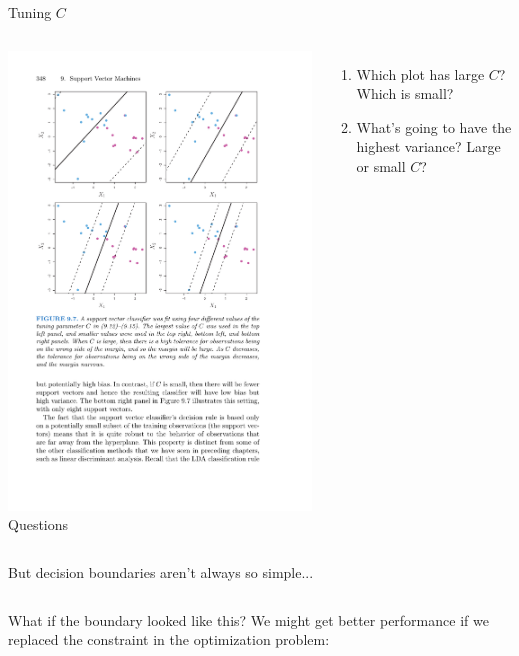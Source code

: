 \documentclass[mathserif, aspectratio=169]{beamer}
\begin{document}
\begin{frame}{Tuning $C$}
\begin{columns}
\includegraphics[height = 0.9\textheight]{small_vs_big_C}
Questions
\begin{enumerate}
\item Which plot has large $C$?  Which is small?
\item What's going to have the highest variance?  Large or small $C$?
\end{enumerate}

\end{columns}
\end{frame}

\begin{frame}{But decision boundaries aren't always so simple...}

\begin{columns}
What if the boundary looked like this?
\vspace{40mm}
We might get better performance if we replaced the constraint in the optimization problem:

\vspace{40mm}

\end{columns}
\end{frame}
\end{document}
